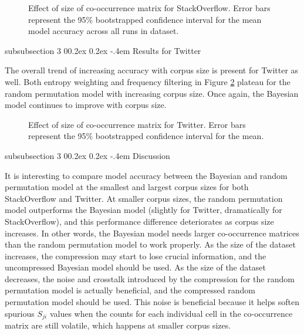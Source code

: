 \documentclass[man,donotrepeattitle]{apa6}
\makeatletter
\renewcommand{\subsubsection}{%
  \@startsection
  {subsubsection}%
  {3}%
  {\parindent}%
  {0\baselineskip \@plus 0.2ex \@minus 0.2ex}%
  {-.4em}%
  {\normalfont\normalsize\bfseries\addperi}}
\makeatother
\begin{document}
\begin{figure}[!htbp]
  \caption{
    Effect of size of co-occurrence matrix for StackOverflow.
    Error bars represent the 95\% bootstrapped confidence interval for the mean model accuracy across all runs in dataset.
  }
  \label{figContextDocumentSizeSO}
\end{figure}

\subsubsection{Results for Twitter}

The overall trend of increasing accuracy with corpus size is present for Twitter as well.
Both entropy weighting and frequency filtering in Figure \ref{figContextDocumentSizeT} plateau for the random permutation model with increasing corpus size.
Once again, the Bayesian model continues to improve with corpus size.

\begin{figure}[!htbp]
  \caption{
    Effect of size of co-occurrence matrix for Twitter.
    Error bars represent the 95\% bootstrapped confidence interval for the mean.
  }
  \label{figContextDocumentSizeT}
\end{figure}

\subsubsection{Discussion}

It is interesting to compare model accuracy between the Bayesian and random permutation model at the smallest and largest corpus sizes for both StackOverflow and Twitter.
At smaller corpus sizes, the random permutation model outperforms the Bayesian model (slightly for Twitter, dramatically for StackOverflow), and this performance difference deteriorates as corpus size increases.
In other words, the Bayesian model needs larger co-occurrence matrices than the random permutation model to work properly.
As the size of the dataset increases, the compression may start to lose crucial information, and the uncompressed Bayesian model should be used.
As the size of the dataset decreases, the noise and crosstalk introduced by the compression for the random permutation model is actually beneficial, and the compressed random permutation model should be used. 
This noise is beneficial because it helps soften spurious $S_{ji}$ values when the counts for each individual cell in the co-occurrence matrix are still volatile, which happens at smaller corpus sizes.
\end{document}
